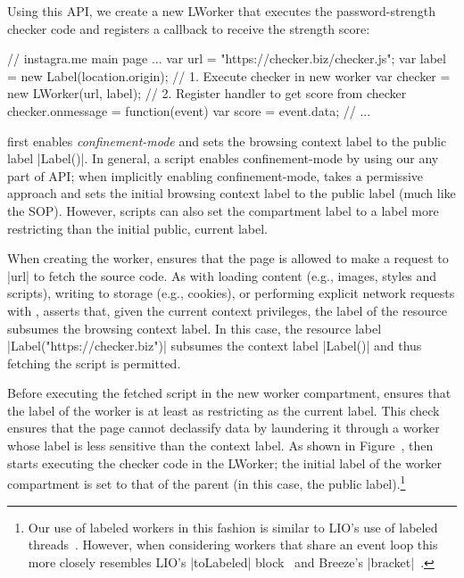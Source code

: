Using this API, we create a new LWorker that executes the
password-strength checker code and registers a callback to receive the
strength score:
\begin{jscode}
// instagra.me main page ...
var url = "https://checker.biz/checker.js";
var label = new Label(location.origin);
// 1. Execute checker in new worker
var checker = new LWorker(url, label);
// 2. Register handler to get score from checker
checker.onmessage = function(event) {
  var score = event.data; 
  // ...
}
\end{jscode}
%
\sys{} first enables \emph{confinement-mode} and sets the browsing
context label to the public label \js|Label()|.
%
In general, a script enables confinement-mode by using our any part of
API; when implicitly enabling confinement-mode, \sys{} takes a
permissive approach and sets the initial browsing context label to the
public label (much like the SOP).
%
However, scripts can also set the compartment label to a label more
restricting than the initial public, current label.
 
When creating the worker, \sys{} ensures that the page is allowed to
make a request to \js|url| to fetch the source code.
%
As with loading content (e.g., images, styles and scripts), writing to
storage (e.g., cookies), or performing explicit network requests with
\xhr{}, \sys{} asserts that, given the current context privileges, the
label of the resource subsumes the browsing context label.
%
In this case, the resource label \js|Label("https://checker.biz")|
subsumes the context label \js|Label()| and thus fetching the script
is permitted.

Before executing the fetched script in the new worker compartment, \sys{}
ensures that the label of the worker is at least as restricting as the
current label.
%
This check ensures that the page cannot declassify data by laundering
it through a worker whose label is less sensitive than the context
label.
%
\iffigures
\ifcompletefigures
As shown in Figure~, 
\fi
\fi
\sys{} then starts
executing the checker code in the LWorker; the initial label of the
worker compartment is set to that of the parent (in this case, the
public label).\footnote{
%
Our use of labeled workers in this fashion is similar to LIO's
use of labeled threads~\cite{stefan:addressing-covert}.
%
However, when considering workers that share an event loop this more
closely resembles LIO's \js|toLabeled|
block~\cite{stefan:2011:flexible} and Breeze's
\js|bracket|~\cite{Breeze13}.
}
 
